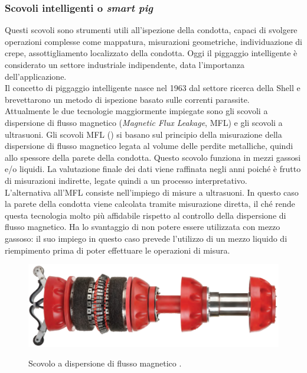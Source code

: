 \subsubsection*{Scovoli intelligenti o \textit{smart pig}}
Questi scovoli sono strumenti utili all'ispezione della condotta, capaci di svolgere operazioni complesse come mappatura, misurazioni geometriche, individuazione di crepe, assottigliamento localizzato della condotta. Oggi il piggaggio intelligente è considerato un settore industriale indipendente, data l'importanza dell'applicazione.\\
Il concetto di piggaggio intelligente nasce nel 1963 dal settore ricerca della Shell e brevettarono un metodo di ispezione basato sulle correnti parassite.\\
Attualmente le due tecnologie maggiormente impiegate sono gli scovoli a dispersione di flusso magnetico (\textit{Magnetic Flux Leakage}, MFL) e gli scovoli a ultrasuoni.
Gli scovoli MFL () si basano sul principio della misurazione della dispersione di flusso magnetico legata al volume delle perdite metalliche, quindi allo spessore della parete della condotta. Questo scovolo funziona in mezzi gassosi e/o liquidi. La valutazione finale dei dati viene raffinata negli anni poiché è frutto di misurazioni indirette, legate quindi a un processo interpretativo.\\
L'alternativa all'MFL consiste nell'impiego di misure a ultrasuoni. In questo caso la parete della condotta viene calcolata tramite misurazione diretta, il ché rende questa tecnologia molto più affidabile rispetto al controllo della dispersione di flusso magnetico. Ha lo svantaggio di non potere essere utilizzata con mezzo gassoso: il suo impiego in questo caso prevede l'utilizzo di un mezzo liquido di riempimento prima di poter effettuare le operazioni di misura.

\begin{figure}[htbp]
	\centering
	\includegraphics[width=.6\textwidth]{fig/pig/smartpig}
	\label{fig:smartpig}
	\caption{Scovolo a dispersione di flusso magnetico \parencite{williamson2015guide}.}
\end{figure}

